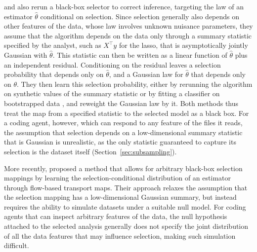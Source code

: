 \documentclass[10pt]{article}
\begin{document}
\citet{markovic2019inference} and \citet{liu2022black} also rerun a black-box selector to correct inference, targeting the law of an estimator $\widehat\theta$ conditional on selection. Since selection generally also depends on other features of the data, whose law involves unknown nuisance parameters, they assume that the algorithm depends on the data only through a summary statistic specified by the analyst, such as $X^\top y$ for the lasso, that is asymptotically jointly Gaussian with $\widehat\theta$. This statistic can then be written as a linear function of $\widehat\theta$ plus an independent residual. Conditioning on the residual leaves a selection probability that depends only on $\widehat\theta$, and a Gaussian law for $\widehat\theta$ that depends only on $\theta$. They then learn this selection probability, either by rerunning the algorithm on synthetic values of the summary statistic \citep{markovic2019inference} or by fitting a classifier on bootstrapped data \citep{liu2022black}, and reweight the Gaussian law by it. Both methods thus treat the map from a specified statistic to the selected model as a black box. For a coding agent, however, which can respond to any feature of the files it reads, the assumption that selection depends on a low-dimensional summary statistic that is Gaussian is unrealistic, as the only statistic guaranteed to capture its selection is the dataset itself (Section~\ref{sec:subsampling}).

More recently, \citet{liu2025flexible} proposed a method that allows for arbitrary black-box selection mappings by learning the selection-conditional distribution of an estimator through flow-based transport maps. Their approach relaxes the assumption that the selection mapping has a low-dimensional Gaussian summary, but instead requires the ability to simulate datasets under a suitable null model. For coding agents that can inspect arbitrary features of the data, the null hypothesis attached to the selected analysis generally does not specify the joint distribution of all the data features that may influence selection, making such simulation difficult.
\end{document}
